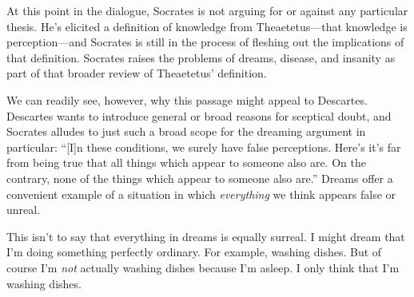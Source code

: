 At this point in the dialogue, Socrates is not arguing for or against any particular thesis. He's elicited a definition of knowledge from Theaetetus---that knowledge is perception---and Socrates is still in the process of fleshing out the implications of that definition. Socrates raises the problems of dreams, disease, and insanity as part of that broader review of Theaetetus' definition.

We can readily see, however, why this passage might appeal to Descartes. Descartes wants to introduce general or broad reasons for sceptical doubt, and Socrates alludes to just such a broad scope for the dreaming argument in particular: ``[I]n these conditions, we surely have false perceptions. Here's it's far from being true that all things which appear to someone also are. On the contrary, none of the things which appear to someone also are.'' Dreams offer a convenient example of a situation in which \textit{everything} we think appears false or unreal.

This isn't to say that everything in dreams is equally surreal. I might dream that I'm doing something perfectly ordinary. For example, washing dishes. But of course I'm \textit{not} actually washing dishes because I'm asleep. I only think that I'm washing dishes.

